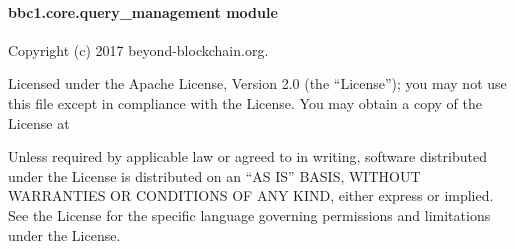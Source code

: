 \documentclass[letterpaper,10pt,english]{sphinxmanual}
\begin{document}

\begin{fulllineitems}
\label{\detokenize{bbc1.core.message_key_types:bbc1.core.message_key_types.to_2byte}}
\end{fulllineitems}


\begin{fulllineitems}
\label{\detokenize{bbc1.core.message_key_types:bbc1.core.message_key_types.to_4byte}}
\end{fulllineitems}


\begin{fulllineitems}
\label{\detokenize{bbc1.core.message_key_types:bbc1.core.message_key_types.unset_cipher}}
\end{fulllineitems}



\paragraph{bbc1.core.query\_management module}
\label{\detokenize{bbc1.core.query_management:bbc1-core-query-management-module}}\label{\detokenize{bbc1.core.query_management:module-bbc1.core.query_management}}\label{\detokenize{bbc1.core.query_management::doc}}
Copyright (c) 2017 beyond-blockchain.org.

Licensed under the Apache License, Version 2.0 (the “License”);
you may not use this file except in compliance with the License.
You may obtain a copy of the License at
\begin{quote}

\end{quote}

Unless required by applicable law or agreed to in writing, software
distributed under the License is distributed on an “AS IS” BASIS,
WITHOUT WARRANTIES OR CONDITIONS OF ANY KIND, either express or implied.
See the License for the specific language governing permissions and
limitations under the License.
\end{document}
